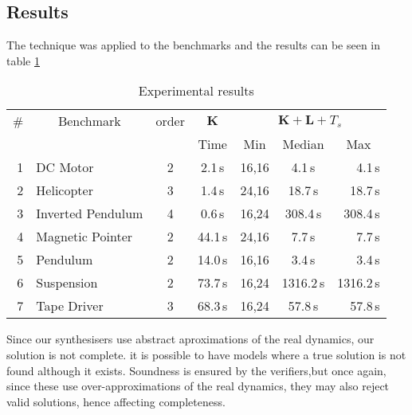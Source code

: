 \documentclass[sigconf]{llncs}
\newcommand{\mat}[1]{\boldsymbol{#1}}
\begin{document}
\subsection{Results}
\label{exp:results}
The technique was applied  to the benchmarks and the results can be seen in table \ref{tab:results}
\begin{table}
\centering
%
\begin{tabular}{| r | l | c | c | r | c | r |}
%
\hline
\# & \multicolumn{1}{|c|}{Benchmark} & \multicolumn{1}{|c|}{order}  & \multicolumn{1}{|c|}{$\mat{K}$} & \multicolumn{3}{|c|}{$\mat{K}+\mat{L}+T_s$} \\
   &                                  & & \multicolumn{1}{|c|}{Time} & \multicolumn{1}{|c|}{Min} & \multicolumn{1}{|c|}{Median} & \multicolumn{1}{|c|}{Max}\\\hline
1  & DC Motor          & 2 & 2.1\,s& 16,16  &   4.1\,s &   4.1\,s\\
2  & Helicopter        & 3  & 1.4\,s& 24,16  &   18.7\,s &   18.7\,s\\
3  & Inverted Pendulum & 4 &   0.6\,s& 16,24  &  308.4\,s &  308.4\,s\\
4  & Magnetic Pointer  & 2  & 44.1\,s& 24,16  &  7.7\,s &  7.7\,s \\
5  & Pendulum          & 2 & 14.0\,s& 16,16  &   3.4\,s &   3.4\,s\\
6  & Suspension        & 2 & 73.7\,s& 16,24  &   1316.2\,s &   1316.2\,s\\
7  & Tape Driver       & 3 & 68.3\,s& 16,24  &   57.8\,s &   57.8\,s\\
\hline
%
\end{tabular}
\vspace{0.05in}
\caption{Experimental results\label{tab:results}}
\end{table}

Since our synthesisers use abstract aproximations of the real dynamics, our solution is not complete.
it is possible to have models where a true solution is not found although it exists.
Soundness is ensured by the verifiers,but once again, since these use over-approximations of the real dynamics, they may also reject valid solutions, hence affecting completeness. 
\end{document}
